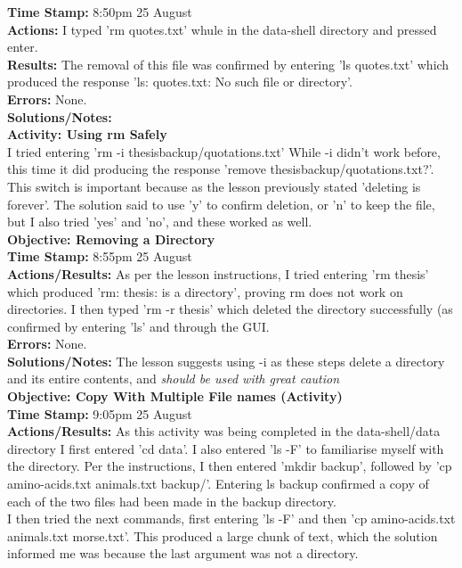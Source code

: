 \documentclass{article}
\begin{document}
\begin{FlushLeft}
\textbf{Time Stamp:} 8:50pm 25 August\\
\textbf{Actions:} I typed 'rm quotes.txt' whule in the data-shell directory and pressed enter.\\
\textbf{Results:} The removal of this file was confirmed by entering 'ls quotes.txt' which produced the response 'ls: quotes.txt: No such file or directory'.\\
\textbf{Errors:} None.\\
\textbf{Solutions/Notes:}\\
\vspace{5mm}
\textbf{Activity: Using rm Safely}\\
I tried entering 'rm -i thesis\textunderscore backup/quotations.txt' While -i didn't work before, this time it did producing the response 'remove thesis\textunderscore backup/quotations.txt?'. This switch is important because as the lesson previously stated 'deleting is forever'. The solution said to use 'y' to confirm deletion, or 'n' to keep the file, but I also tried 'yes' and 'no', and these worked as well.\\
\vspace{5mm}
\textbf{Objective: Removing a Directory}\\ 
\textbf{Time Stamp:} 8:55pm 25 August\\
\textbf{Actions/Results:} As per the lesson instructions, I tried entering 'rm thesis' which produced 'rm: thesis: is a directory', proving rm does not work on directories. I then typed 'rm -r thesis' which deleted the directory successfully (as confirmed by entering 'ls' and through the GUI.\\ 
\textbf{Errors:} None.\\
\textbf{Solutions/Notes:} The lesson suggests using -i as these steps delete a directory and its entire contents, and \textit{should be used with great caution}\\
\vspace{5mm}
\textbf{Objective: Copy With Multiple File names (Activity)}\\ 
\textbf{Time Stamp:} 9:05pm 25 August\\
\textbf{Actions/Results:} As this activity was being completed in the data-shell/data directory I first entered 'cd data'. I also entered 'ls -F' to familiarise myself with the directory. Per the instructions, I then entered 'mkdir backup', followed by 'cp amino-acids.txt animals.txt backup/'. Entering ls backup confirmed a copy of each of the two files had been made in the backup directory. \\ I then tried the next commands, first entering 'ls -F' and then 'cp amino-acids.txt animals.txt morse.txt'. This produced a large chunk of text, which the solution informed me was because the last argument was not a directory.\\

\end{FlushLeft}
\end{document}
